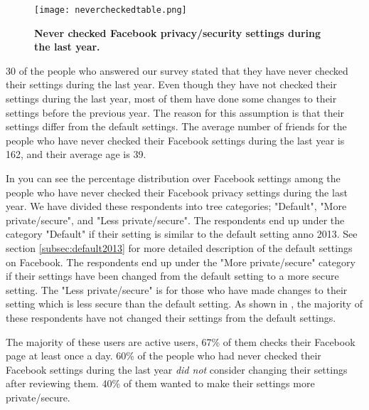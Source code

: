 \begin{figure}[b]
\centering
\texttt{[image: nevercheckedtable.png]}
\caption[Never checked Facebook privacy/security settings during the last year]{\textbf{Never checked Facebook privacy/security settings during the last year.}} 
\label{fig:neverchecked}
\end{figure}

30 of the people who answered our survey stated that they have never checked their settings during the last year. Even though they have not checked their  settings during the last year, most of them have done some changes to their settings before the previous year. The reason for this assumption is that their settings differ from the default settings.  
The average number of friends for the people who have never checked their Facebook settings during the last year is 162, and their average age is 39. 

In  you can see the percentage distribution over Facebook settings among the people who have never checked their Facebook privacy settings during the last year. We have divided these respondents into tree categories; "Default", "More private/secure", and "Less private/secure". The respondents end up under the category "Default" if their setting is similar to the default setting anno 2013. See section \ref{subsec:default2013} for more detailed description of the default settings on Facebook. The respondents end up under the "More private/secure" category if their settings have been changed from the default setting to a more secure setting. The "Less private/secure" is for those who have made changes to their setting which is less secure than the default setting. As shown in , the majority of these respondents have not changed their settings from the default settings. 

The majority of these users are active users, 67\% of them checks their Facebook page at least once a day. 60\% of the people who had never checked their Facebook settings during the last year \textit{did not} consider changing their settings after reviewing them. 40\% of them wanted to make their settings more private/secure. 



